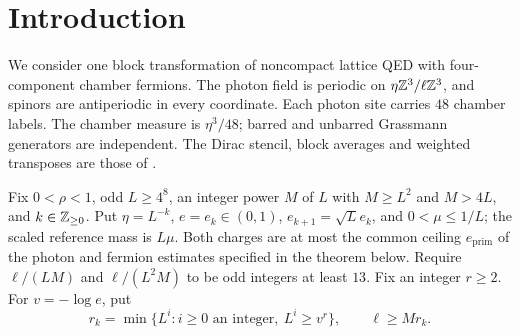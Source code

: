 \begin{abstract}
We prove an exact finite-volume block identity for lattice QED with
chamber fermions and an independent external connection. Under explicit
domain, primitive and small-charge hypotheses, two finite localizations
produce a fluctuation activity whose local logarithm is obtained
from regional integrals and finite differences. We prove its local
symmetries, a norm bound after scaling,
and a coupling-difference estimate on the unit data ball. The resulting
activity, mass, vacuum and external scalar maps reproduce the complete
outgoing density and its unnormalized photon-box marginal. The first
step integrates all chamber components with their weighted Berezin
measure.
\end{abstract}
\maketitle
\tableofcontents
\section{Introduction}\label{sec:introduction}

We consider one block transformation of noncompact lattice QED with
four-component chamber fermions. The photon field is periodic on
$\eta\mathbb Z^3/\ell\mathbb Z^3$, and spinors are antiperiodic in every coordinate.
Each photon site carries $48$ chamber labels. The chamber measure is
$\eta^3/48$; barred and unbarred Grassmann generators are independent.
The Dirac stencil, block averages and weighted transposes are those of
\cite[\S1]{FermionBlockManuscript}.

Fix \(0<\rho<1\), odd \(L\ge4^8\), an integer power \(M\) of \(L\) with \(M\ge L^2\) and \(M>4L\),
and \(k\in\mathbb Z_{\ge0}\). Put \(\eta=L^{-k}\), \(e=e_k\in(0,1)\),
\(e_{k+1}=\sqrt L e_k\), and \(0<\mu\le1/L\); the scaled reference
mass is \(L\mu\). Both charges are at most the common ceiling $e_{\mathrm{prim}}$ of the
photon and fermion estimates specified in the theorem below. Require
\(\ell/(LM)\) and \(\ell/(L^2M)\) to be odd integers at least \(13\).
Fix an integer \(r\ge2\). For \(v=-\log e\), put
\[
 r_k=\min\{L^i:i\ge0\text{ an integer},\ L^i\ge v^r\},
 \qquad \ell\ge Mr_k .
\]



